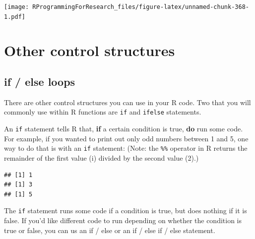 \documentclass[]{book}
\makeatletter
\newenvironment{Shaded}{\begin{snugshade}}{\end{snugshade}}
\newcommand{\KeywordTok}[1]{\textcolor[rgb]{0.13,0.29,0.53}{\textbf{#1}}}
\newcommand{\DecValTok}[1]{\textcolor[rgb]{0.00,0.00,0.81}{#1}}
\newcommand{\StringTok}[1]{\textcolor[rgb]{0.31,0.60,0.02}{#1}}
\newcommand{\ControlFlowTok}[1]{\textcolor[rgb]{0.13,0.29,0.53}{\textbf{#1}}}
\newcommand{\OperatorTok}[1]{\textcolor[rgb]{0.81,0.36,0.00}{\textbf{#1}}}
\newcommand{\NormalTok}[1]{#1}
\newenvironment{kframe}{%
\medskip{}
\setlength{\fboxsep}{.8em}
 \def\at@end@of@kframe{}%
 \ifinner\ifhmode%
  \def\at@end@of@kframe{\end{minipage}}%
  \begin{minipage}{\columnwidth}%
 \fi\fi%
 \def\FrameCommand##1{\hskip\@totalleftmargin \hskip-\fboxsep
 \colorbox{shadecolor}{##1}\hskip-\fboxsep
     \hskip-\linewidth \hskip-\@totalleftmargin \hskip\columnwidth}%
 \MakeFramed {\advance\hsize-\width
   \@totalleftmargin\z@ \linewidth\hsize
   \@setminipage}}%
 {\par\unskip\endMakeFramed%
 \at@end@of@kframe}
\renewenvironment{Shaded}{\begin{kframe}}{\end{kframe}}
\theoremstyle{definition}
\theoremstyle{definition}
\theoremstyle{definition}
\theoremstyle{remark}
\makeatother
\begin{document}
\texttt{[image: RProgrammingForResearch\_files/figure-latex/unnamed-chunk-368-1.pdf]}

\section{Other control structures}\label{other-control-structures}

\subsection{if / else loops}\label{if-else-loops}

There are other control structures you can use in your R code. Two that
you will commonly use within R functions are \texttt{if} and
\texttt{ifelse} statements. \bigskip

An \texttt{if} statement tells R that, \textbf{if} a certain condition
is true, \textbf{do} run some code. For example, if you wanted to print
out only odd numbers between 1 and 5, one way to do that is with an
\texttt{if} statement: (Note: the \texttt{\%\%} operator in R returns
the remainder of the first value (i) divided by the second value (2).)

\begin{Shaded}
\end{Shaded}

\begin{verbatim}
## [1] 1
## [1] 3
## [1] 5
\end{verbatim}

The \texttt{if} statement runs some code if a condition is true, but
does nothing if it is false. If you'd like different code to run
depending on whether the condition is true or false, you can us an if /
else or an if / else if / else statement.

\begin{Shaded}
\end{Shaded}
\end{document}
